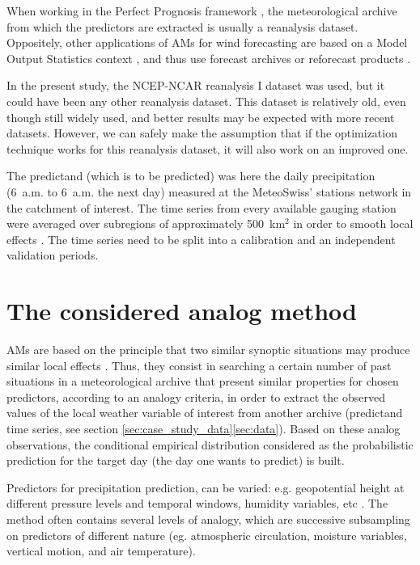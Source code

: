 \documentclass{ametsoc}
\begin{document}
When working in the Perfect Prognosis framework \citep{Klein1963}, the meteorological archive from which the predictors are extracted is usually a reanalysis dataset. Oppositely, other applications of AMs for wind forecasting are based on a Model Output Statistics context \citep[MOS, see][]{Glahn1972}, and thus use forecast archives or reforecast products \citep[e.g.][]{DelleMonache2013, DelleMonache2011, Alessandrini2015, Junk2015, Junk2015c}.

In the present study, the NCEP-NCAR reanalysis I dataset \citep[6-hourly, 17 pressure levels at a resolution of 2.5\degree, see][]{Kalnay1996} was used, but it could have been any other reanalysis dataset. This dataset is relatively old, even though still widely used, and better results may be expected with more recent datasets. However, we can safely make the assumption that if the optimization technique works for this reanalysis dataset, it will also work on an improved one.

The predictand (which is to be predicted) was here the daily precipitation (6~a.m. to 6~a.m. the next day) measured at the MeteoSwiss' stations network in the catchment of interest. The time series from every available gauging station were averaged over subregions of approximately 500~km$^{2}$ \citep[see][for the details]{Horton2012a} in order to smooth local effects \citep{Obled2002, Marty2012}. The time series need to be split into a calibration and an independent validation periods.


\section{The considered analog method}
\label{sec:am}

AMs are based on the principle that two similar synoptic situations may produce similar local effects \citep{Lorenz1956, Lorenz1969}. Thus, they consist in searching a certain number of past situations in a meteorological archive that present similar properties for chosen predictors, according to an analogy criteria, in order to extract the observed values of the local weather variable of interest from another archive (predictand time series, see section \ref{sec:case_study_data}\ref{sec:data}). Based on these analog observations, the conditional empirical distribution considered as the probabilistic prediction for the target day (the day one wants to predict) is built.

Predictors for precipitation prediction, can be varied: e.g. geopotential height at different pressure levels and temporal windows, humidity variables, etc \citep[see][for a more detailed list of predictors]{BenDaoud2016}. The method often contains several levels of analogy, which are successive subsampling on predictors of different nature (eg. atmospheric circulation, moisture variables, vertical motion, and air temperature). 
\end{document}

